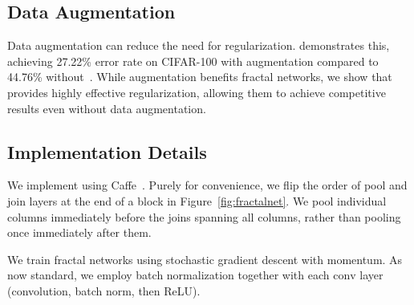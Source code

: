 \subsection{Data Augmentation}
\label{sec:data-aug}

Data augmentation can reduce the need for regularization.  {\Resnet}
demonstrates this, achieving 27.22\% error rate on CIFAR-100 with augmentation
compared to 44.76\% without~\citep{huang2016stochasticdepth}.  While
augmentation benefits fractal networks, we show that {\droppath} provides
highly effective regularization, allowing them to achieve competitive results
even without data augmentation.

\subsection{Implementation Details}
\label{sec:implementation}

We implement {\fracnet} using Caffe~\citep{caffe14}.  Purely for convenience,
we flip the order of pool and join layers at the end of a block in
Figure~\ref{fig:fractalnet}.  We pool individual columns immediately before
the joins spanning all columns, rather than pooling once immediately after
them.

We train fractal networks using stochastic gradient descent with momentum.  As
now standard, we employ batch normalization together with each $\mathrm{conv}$
layer (convolution, batch norm, then ReLU).
